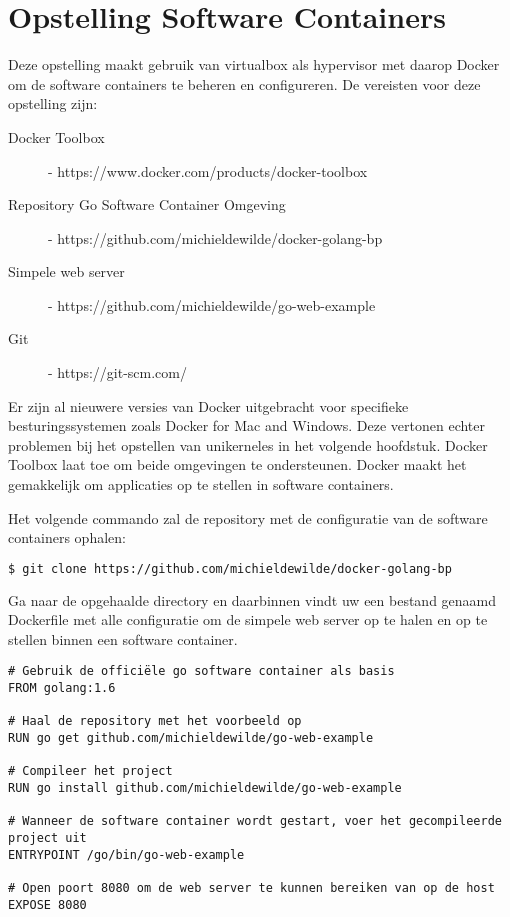 \section{Opstelling Software Containers}

Deze opstelling maakt gebruik van virtualbox als hypervisor met daarop Docker om de software containers te beheren en configureren.
De vereisten voor deze opstelling zijn:
\begin{description}
\item [Docker Toolbox] - https://www.docker.com/products/docker-toolbox
\item [Repository Go Software Container Omgeving] - https://github.com/michieldewilde/docker-golang-bp
\item [Simpele web server] - https://github.com/michieldewilde/go-web-example
\item [Git] - https://git-scm.com/
\end{description}

Er zijn al nieuwere versies van Docker uitgebracht voor specifieke besturingssystemen zoals Docker for Mac and Windows. Deze vertonen echter problemen bij het opstellen van unikerneles in het volgende hoofdstuk. Docker Toolbox laat toe om beide omgevingen te ondersteunen. Docker maakt het gemakkelijk om applicaties op te stellen in software containers.

\noindent Het volgende commando zal de repository met de configuratie van de software containers ophalen:
\begin{lstlisting}[language=bash]
  $ git clone https://github.com/michieldewilde/docker-golang-bp
\end{lstlisting}

Ga naar de opgehaalde directory en daarbinnen vindt uw een bestand genaamd Dockerfile met alle configuratie om de simpele web server op te halen en op te stellen binnen een software container.

\begin{lstlisting}[language=docker,caption={Dockerfile},breaklines=true,label={code:docker}]
# Gebruik de officiële go software container als basis
FROM golang:1.6

# Haal de repository met het voorbeeld op
RUN go get github.com/michieldewilde/go-web-example

# Compileer het project
RUN go install github.com/michieldewilde/go-web-example

# Wanneer de software container wordt gestart, voer het gecompileerde project uit
ENTRYPOINT /go/bin/go-web-example

# Open poort 8080 om de web server te kunnen bereiken van op de host
EXPOSE 8080
\end{lstlisting}

